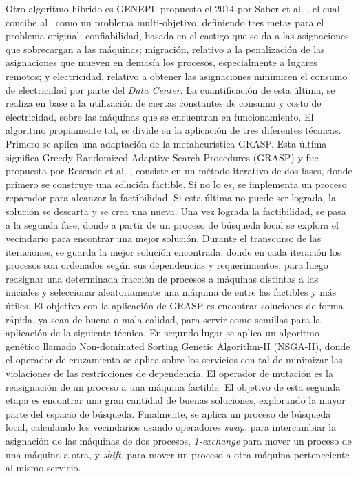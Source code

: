 \documentclass[../informe2.tex]{subfiles}
\begin{document}
Otro algoritmo híbrido es GENEPI, propuesto el 2014 por Saber et al. \cite{saber2014genepi}, el cual concibe al \mrp\ como un problema multi-objetivo, definiendo tres metas para el problema original: confiabilidad, basada en el castigo que se da a las asignaciones que sobrecargan a las máquinas; migración, relativo a la penalización de las asignaciones que mueven en demasía los procesos, especialmente a lugares remotos; y electricidad, relativo a obtener las asignaciones minimicen el consumo de electricidad por parte del \textit{Data Center}. La cuantificación de esta última, se realiza en base a la utilización de ciertas constantes de consumo y costo de electricidad, sobre las máquinas que se encuentran en funcionamiento. El algoritmo propiamente tal, se divide en la aplicación de tres diferentes técnicas. Primero se aplica una adaptación de la metaheurística GRASP. Esta última significa  Greedy Randomized Adaptive Search Procedures (GRASP) y fue propuesta por Resende et al. \cite{resende1995grasp}, consiste en un método iterativo de dos fases, donde primero se construye una solución factible. Si no lo es, se implementa un proceso reparador para alcanzar la factibilidad. Si esta última no puede ser lograda, la solución se descarta y se crea una nueva. Una vez lograda la factibilidad, se pasa a la segunda fase, donde a partir de un proceso de búsqueda local se explora el vecindario para encontrar una mejor solución. Durante el transcurso de las iteraciones, se guarda la mejor solución encontrada. donde en cada iteración los procesos son ordenados según sus dependencias y requerimientos, para luego reasignar una determinada fracción de procesos a máquinas distintas a las iniciales y seleccionar aleatoriamente una máquina de entre las factibles y más útiles. El objetivo con la aplicación de GRASP es encontrar soluciones de forma rápida, ya sean de buena o mala calidad, para servir como semillas para la aplicación de la siguiente técnica. En segundo lugar se aplica un algoritmo genético llamado Non-dominated Sorting Genetic Algorithm-II (NSGA-II), donde el operador de cruzamiento se aplica sobre los servicios con tal de minimizar las violaciones de las restricciones de dependencia. El operador de mutación es la reasignación de un proceso a una máquina factible. El objetivo de esta segunda etapa es encontrar una gran cantidad de buenas soluciones, explorando la mayor parte del espacio de búsqueda. Finalmente, se aplica un proceso de búsqueda local, calculando los vecindarios usando operadores \textit{swap}, para intercambiar la asignación de las máquinas de dos procesos, \textit{1-exchange} para mover un proceso de una máquina a otra, y \textit{shift}, para mover un proceso a otra máquina perteneciente al mismo servicio.
\end{document}

